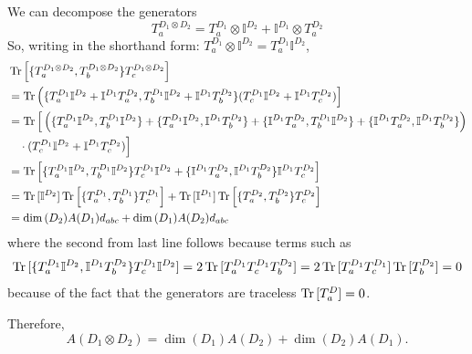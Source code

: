 \documentclass[main.tex]{subfiles}
\begin{document}
We can decompose the generators
\begin{equation}
T_a^{D_1\otimes D_2}=T_a^{D_1}\otimes\mathbb{I}^{D_2}+\mathbb{I}^{D_1}\otimes T_a^{D_2}
\end{equation}
So, writing in the shorthand form: $T_a^{D_1}\otimes\mathbb{I}^{D_2}=T_a^{D_1}\mathbb{I}^{D_2}$,
\begin{align}
&\operatorname{Tr}{\left[\{T_a^{D_1\otimes D_2},T_b^{D_1\otimes D_2}\}T_c^{D_1\otimes D_2}\right]}\nonumber\\
&=\operatorname{Tr}{\left(\{T_a^{D_1}\mathbb{I}^{D_2}+\mathbb{I}^{D_1} T_a^{D_2},T_b^{D_1}\mathbb{I}^{D_2}+\mathbb{I}^{D_1} T_b^{D_2}\}(T_c^{D_1}\mathbb{I}^{D_2}+\mathbb{I}^{D_1} T_c^{D_2})\right]}\\
&=\operatorname{Tr}\Big[\left(\{T_a^{D_1}\mathbb{I}^{D_2},T_b^{D_1}\mathbb{I}^{D_2}\}+\{T_a^{D_1}\mathbb{I}^{D_2},\mathbb{I}^{D_1}T_b^{D_2}\}+\{\mathbb{I}^{D_1} T_a^{D_2},T_b^{D_1}\mathbb{I}^{D_2}\}+\{\mathbb{I}^{D_1} T_a^{D_2},\mathbb{I}^{D_1}T_b^{D_2}\}\right)\nonumber\\
&\quad\cdot(T_c^{D_1}\mathbb{I}^{D_2}+\mathbb{I}^{D_1} T_c^{D_2})\Big]\\
&=\operatorname{Tr}{\left[\{T_a^{D_1}\mathbb{I}^{D_2},T_b^{D_1}\mathbb{I}^{D_2}\}T_c^{D_1}\mathbb{I}^{D_2}+\{\mathbb{I}^{D_1} T_a^{D_2},\mathbb{I}^{D_1} T_b^{D_2}\}\mathbb{I}^{D_1} T_c^{D_2}\right]}\\
&=\operatorname{Tr}{[\mathbb{I}^{D_2}]}\operatorname{Tr}{\left[\{T_a^{D_1},T_b^{D_1}\}T_c^{D_1}\right]}+\operatorname{Tr}{[\mathbb{I}^{D_1}]}\operatorname{Tr}{\left[\{T_a^{D_2},T_b^{D_2}\}T_c^{D_2}\right]}\\
&=\dim{(D_2)}A(D_1)d_{abc}+\dim{(D_1)}A(D_2)d_{abc}
\end{align}
where the second from last line follows because terms such as
\begin{align}
\operatorname{Tr}{[\{T_a^{D_1}\mathbb{I}^{D_2},\mathbb{I}^{D_1}T_b^{D_2}\}T^{D_1}_c\mathbb{I}^{D_2}]}=2\operatorname{Tr}{[T_a^{D_1}T^{D_1}_cT_b^{D_2}]}=2\operatorname{Tr}{[T_a^{D_1}T^{D_1}_c]}\operatorname{Tr}{[T_b^{D_2}]}=0
\end{align}
 because of the fact that the generators are traceless $\operatorname{Tr}{[T_a^D]}=0$.
 
 Therefore,
 \begin{equation}
 A(D_1\otimes D_2)=\dim{(D_1)}A(D_2)+\dim{(D_2)}A(D_1).
 \end{equation}
\end{document}
